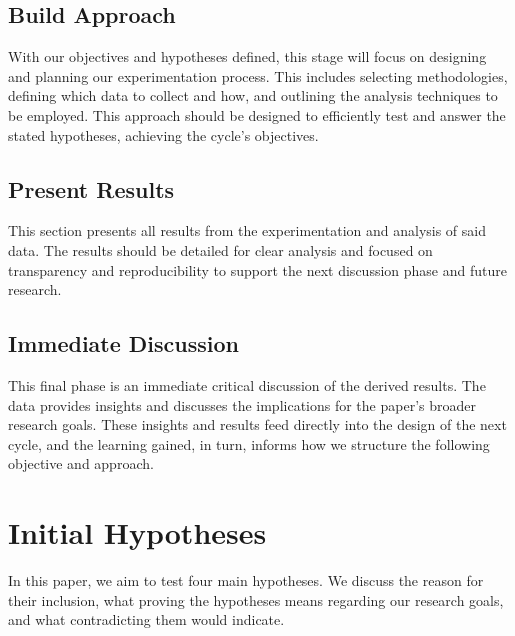 \subsection*{Build Approach}
With our objectives and hypotheses defined, this stage will focus on designing and planning our experimentation process. This includes selecting methodologies, defining which data to collect and how, and outlining the analysis techniques to be employed. This approach should be designed to efficiently test and answer the stated hypotheses, achieving the cycle's objectives.

\subsection*{Present Results}
This section presents all results from the experimentation and analysis of said data. The results should be detailed for clear analysis and focused on transparency and reproducibility to support the next discussion phase and future research.

\subsection*{Immediate Discussion}
This final phase is an immediate critical discussion of the derived results. The data provides insights and discusses the implications for the paper's broader research goals. These insights and results feed directly into the design of the next cycle, and the learning gained, in turn, informs how we structure the following objective and approach.


\section{Initial Hypotheses}
In this paper, we aim to test four main hypotheses. We discuss the reason for their inclusion, what proving the hypotheses means regarding our research goals, and what contradicting them would indicate.


